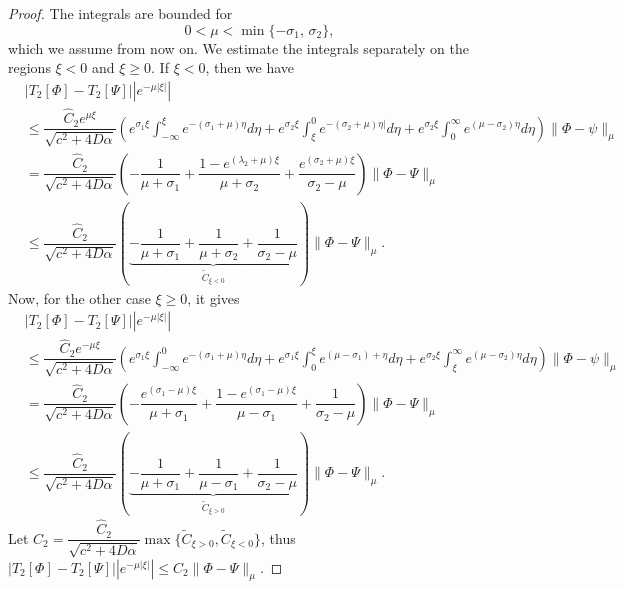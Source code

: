 \documentclass[11pt]{article}
\theoremstyle{definition}
\begin{document}
{\begin{proof}
The integrals are bounded for 
\[
0 < \mu < \min\{-\sigma_{1},\, \sigma_{2}\},
\]
which we assume from now on.  
We estimate the integrals separately on the regions $\xi < 0$ and $\xi \ge 0$.  
If $\xi < 0$, then we have
\begin{align}
     &  |T_2[\Phi]-T_2[\Psi]||e^{- \mu |\xi|}| \\ &\le\dfrac{\widehat{C}_2 e^{\mu \xi}}{\sqrt{c^2+ 4 D \alpha}}\left( e^{\sigma_1 \xi}\int_{- \infty}^{\xi}e^{-(\sigma_1+ \mu)\eta} d \eta 
 + e^{\sigma_2 \xi}\int_{\xi}^{0 }e^{-(\sigma_2+ \mu)\eta|} d \eta + e^{\sigma_2 \xi}\int_{0}^{\infty }e^{(\mu-\sigma_2)\eta} d \eta\right)\|\Phi-\psi\|_\mu    \\ &= \dfrac{\widehat{C}_2}{\sqrt{c^2+4 D \alpha}} \left( - \dfrac{1}{\mu + \sigma_1}+ \dfrac{1-e^{{(\lambda_2+\mu)\xi}}}{\mu+ \sigma_2}+ \dfrac{e^{(\sigma_2+\mu)\xi}}{\sigma_2- \mu} \right) \|\Phi-\Psi\|_\mu \\ &\le   \dfrac{\widehat{C}_2}{\sqrt{c^2+4 D \alpha}} \left(\underbrace{ - \dfrac{1}{\mu + \sigma_1}+ \dfrac{1}{\mu+ \sigma_2}+ \dfrac{1}{\sigma_2- \mu}}_{\tilde C_{\xi <0}} \right) \|\Phi-\Psi\|_\mu.
\end{align}
Now, for the other case $\xi \geq 0$, it gives \begin{align}
     &  |T_2[\Phi]-T_2[\Psi]||e^{- \mu |\xi|}| \\ &\le\dfrac{\widehat{C}_2 e^{-\mu \xi}}{\sqrt{c^2+ 4 D \alpha}}\left( e^{\sigma_1 \xi}\int_{- \infty}^{0}e^{-(\sigma_1+ \mu)\eta} d \eta 
 + e^{\sigma_1 \xi}\int_{0}^{\xi }e^{(\mu-\sigma_1)+ \eta} d \eta + e^{\sigma_2 \xi}\int_{\xi}^{\infty }e^{(\mu-\sigma_2)\eta} d \eta\right)\|\Phi-\psi\|_\mu    \\ &= \dfrac{\widehat{C}_2}{\sqrt{c^2+4 D \alpha}} \left( - \dfrac{e^{(\sigma_1-\mu)\xi}}{\mu + \sigma_1}+ \dfrac{1-e^{{(\sigma_1-\mu)\xi}}}{\mu- \sigma_1}+ \dfrac{1}{\sigma_2- \mu} \right) \|\Phi-\Psi\|_\mu \\ &\le   \dfrac{\widehat{C}_2}{\sqrt{c^2+4 D \alpha}} \left(\underbrace{ - \dfrac{1}{\mu + \sigma_1}+ \dfrac{1}{\mu- \sigma_1}+ \dfrac{1}{\sigma_2- \mu}}_{\tilde C_{\xi >0}} \right) \|\Phi-\Psi\|_\mu.
\end{align}
Let $C_2=\dfrac{\widehat{C}_2}{\sqrt{c^2+4 D \alpha}}\max\{\tilde C_{\xi>0}, \tilde C_{\xi<0}\}$, thus $|T_2[\Phi]-T_2[\Psi]||e^{- \mu |\xi|}| \le C_2 \|\Phi-\Psi\|_\mu$.


\end{proof}}
\end{document}
